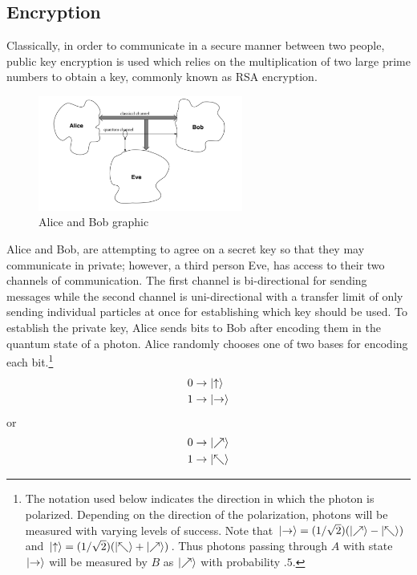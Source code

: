 \documentclass[12pt]{article}
\begin{document}
\subsection{Encryption}
Classically, in order to communicate in a secure manner between two people, public key encryption is used which relies on the multiplication of two large prime numbers to obtain a key, commonly known as RSA encryption.\par 
\begin{figure}
    \centering
    \includegraphics[width=0.6\textwidth]{alice}
    \caption{Alice and Bob graphic}
\end{figure}
Alice and Bob, are attempting to agree on a secret key so that they may communicate in private; however, a third person Eve, has access to their two channels of communication. The first channel is bi-directional for sending messages while the second channel is uni-directional with a transfer limit of only sending individual particles at once for establishing which key should be used. To establish the private key, Alice sends bits to Bob after encoding them in the quantum state of a photon. Alice randomly chooses one of two bases for encoding each bit.\footnote{The notation used below indicates the direction in which the photon is polarized. Depending on the direction of the polarization, photons will be measured with varying levels of success. Note that $\ket{\rightarrow} = (1/\sqrt{2})(\ket{\nearrow}-\ket{\nwarrow})$ and $\ket{\uparrow} = (1/\sqrt{2})(\ket{\nwarrow}+\ket{\nearrow})$. Thus photons passing through $A$ with state $\ket{\rightarrow} $ will be measured by $B$ as $\ket{\nearrow}$ with probability $.5$.\cite{non}}
\begin{align*}
&0\rightarrow \ket{\uparrow}\\
&1\rightarrow \ket{\rightarrow}\\
\end{align*}or\begin{align*}
&0\rightarrow \ket{\nearrow}\\
&1\rightarrow \ket{\nwarrow}\\
\end{align*}
\end{document}
